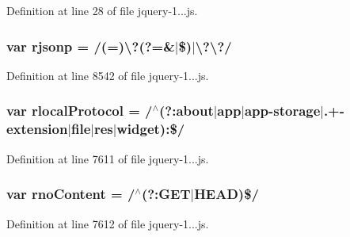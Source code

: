 Definition at line 28 of file jquery-\/1...\+js.

\hypertarget{_scripts_2jquery-1_810_82_8js_a8b62e46075611fd1fc0bbb78b14d113a}{}
\subsubsection[{rjsonp}]{\setlength{\rightskip}{0pt plus 5cm}var rjsonp = /(=)\textbackslash{}?(?=\&$\vert$\$)$\vert$\textbackslash{}?\textbackslash{}?/}\label{_scripts_2jquery-1_810_82_8js_a8b62e46075611fd1fc0bbb78b14d113a}


Definition at line 8542 of file jquery-\/1...\+js.

\hypertarget{_scripts_2jquery-1_810_82_8js_af4dd13c90298bbf53ce08ec707dc9e2a}{}
\subsubsection[{rlocal\+Protocol}]{\setlength{\rightskip}{0pt plus 5cm}var rlocal\+Protocol = /$^\wedge$(?\+:about$\vert$app$\vert$app-\/storage$\vert$.+-\/extension$\vert$file$\vert$res$\vert$widget)\+:\$/}\label{_scripts_2jquery-1_810_82_8js_af4dd13c90298bbf53ce08ec707dc9e2a}


Definition at line 7611 of file jquery-\/1...\+js.

\hypertarget{_scripts_2jquery-1_810_82_8js_a537d744d72e31ec312aa3f16ef576d3f}{}
\subsubsection[{rno\+Content}]{\setlength{\rightskip}{0pt plus 5cm}var rno\+Content = /$^\wedge$(?\+:G\+E\+T$\vert$H\+E\+A\+D)\$/}\label{_scripts_2jquery-1_810_82_8js_a537d744d72e31ec312aa3f16ef576d3f}


Definition at line 7612 of file jquery-\/1...\+js.

\hypertarget{_scripts_2jquery-1_810_82_8js_a0f02b710647fcf95e74593954fb9b4cb}{}
